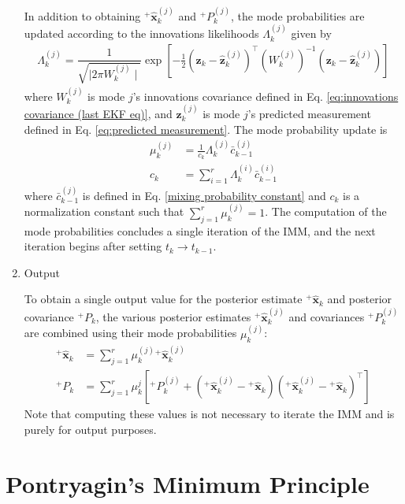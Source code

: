 \begin{enumerate}
    In addition to obtaining ${}^+\hat{\bm{x}}_k^{(j)}$ and ${}^+P_k^{(j)}$, the mode probabilities are updated according to the innovations likelihoods $\Lambda_k^{(j)}$ given by
    \begin{align}
        \Lambda_k^{(j)} = \dfrac{1}{\sqrt{\mid 2\pi W_k^{(j)} \mid}} \exp[-\frac{1}{2} (\bm{z}_k - \bm{\hat{z}}_k^{(j)})^\top (W_k^{(j)})^{-1} (\bm{z}_k - \bm{\hat{z}}_k^{(j)})] \label{eq:innovations-likelihoods}
    \end{align}
    where $W_k^{(j)}$ is mode $j$'s innovations covariance defined in Eq. \ref{eq:innovations covariance (last EKF eq)}, and $\hat{\bm{z}}_k^{(j)}$ is mode $j$'s predicted measurement defined in Eq. \ref{eq:predicted measurement}. The mode probability update is 
    \begin{align}
    \mu_k^{(j)} & = \frac{1}{c_k} \Lambda_k^{(j)} \bar{c}_{k-1}^{(j)} \label{eq:mode-probability-update} \\
    c_k &= \sum_{i=1}^r \Lambda_k^{(i)} \bar{c}_{k-1}^{(i)} 
    \end{align}
    where $\bar{c}_{k-1}^{(j)}$ is defined in Eq. \ref{mixing probability constant} and $c_k$ is a normalization constant such that $\sum_{j=1}^r \mu_k^{(j)} = 1$. The computation of the mode probabilities concludes a single iteration of the IMM, and the next iteration begins after setting $t_k \rightarrow t_{k-1}$.

    \item Output

    To obtain a single output value for the posterior estimate ${}^+\hat{\bm{x}}_k$ and posterior covariance ${}^+P_k $, the various posterior estimates ${}^+\hat{\bm{x}}_k^{(j)}$ and covariances ${}^+P_k^{(j)}$ are combined using their mode probabilities $\mu_k^{(j)}$:
    \begin{align}
        {}^+\bm{\hat{x}}_k &= \sum_{j=1}^r \mu_k^{(j)} {}^+\bm{\hat{x}}_k^{(j)}  \\
        {}^+P_k &= \sum_{j=1}^r \mu_k^j [{}^+P_k^{(j)} + ({}^+\bm{\hat{x}}_k^{(j)} - {}^+\bm{\hat{x}}_k)({}^+\bm{\hat{x}}_k^{(j)} - {}^+\bm{\hat{x}}_k)^\top]
    \end{align}
    Note that computing these values is not necessary to iterate the IMM and is purely for output purposes.
    
\end{enumerate}


\section{Pontryagin's Minimum Principle}

